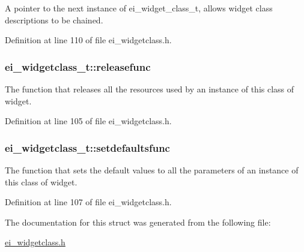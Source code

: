 A pointer to the next instance of ei\-\_\-widget\-\_\-class\-\_\-t, allows widget class descriptions to be chained. 



Definition at line 110 of file ei\-\_\-widgetclass.\-h.

\hypertarget{structei__widgetclass__t_aebe6139b31816495e866c99ec3e83de6}{
\subsubsection[{releasefunc}]{ ei\-\_\-widgetclass\-\_\-t\-::releasefunc}}\label{structei__widgetclass__t_aebe6139b31816495e866c99ec3e83de6}


The function that releases all the resources used by an instance of this class of widget. 



Definition at line 105 of file ei\-\_\-widgetclass.\-h.

\hypertarget{structei__widgetclass__t_a5fec706eefca10172d897cf61b268510}{
\subsubsection[{setdefaultsfunc}]{ ei\-\_\-widgetclass\-\_\-t\-::setdefaultsfunc}}\label{structei__widgetclass__t_a5fec706eefca10172d897cf61b268510}


The function that sets the default values to all the parameters of an instance of this class of widget. 



Definition at line 107 of file ei\-\_\-widgetclass.\-h.



The documentation for this struct was generated from the following file\-:\begin{DoxyCompactItemize}
\item 
\hyperlink{ei__widgetclass_8h}{ei\-\_\-widgetclass.\-h}\end{DoxyCompactItemize}
